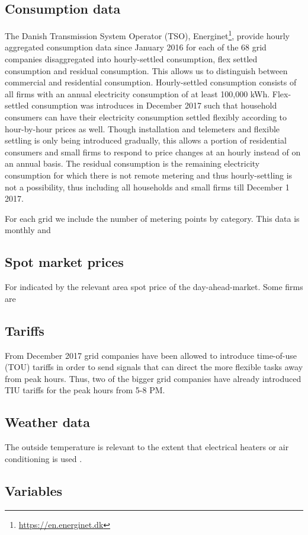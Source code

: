 \label{sec:data}
\subsection{Consumption data}
\label{subsec:data_consumption}
The Danish Transmission System Operator (TSO), Energinet\footnote{\url{https://en.energinet.dk}}, provide hourly aggregated consumption data since January 2016 for each of the 68 grid companies disaggregated into hourly-settled consumption, flex settled consumption and residual consumption. This allows us to distinguish between commercial and residential consumption. Hourly-settled consumption consists of all firms with an annual electricity consumption of at least 100,000 kWh. Flex-settled consumption was introduces in December 2017 such that household consumers can have their electricity consumption settled flexibly according to hour-by-hour prices as well. Though installation and telemeters and flexible settling is only being introduced gradually, this allows a portion of residential consumers and small firms to respond to price changes at an hourly instead of on an annual basis. The residual consumption is the remaining electricity consumption for which there is not remote metering and thus hourly-settling is not a possibility, thus including all households and small firms till December 1 2017.
\par
For each grid we include the number of metering points by category. This data is monthly and 



\subsection{Spot market prices}
\label{subsec:data_spot}
For  indicated by the relevant area spot price of the day-ahead-market. Some firms are 


\subsection{Tariffs}
From December 2017 grid companies have been allowed to introduce time-of-use (TOU) tariffs in order to send signals that can direct the more flexible tasks away from peak hours. Thus, two of the bigger grid companies have already introduced TIU tariffs for the peak hours from 5-8 PM.


\subsection{Weather data}


The outside temperature is relevant to the extent that electrical heaters or air conditioning is used \citep{lijesen2007real, vesterberg2014residential}.


\subsection{Variables}
\label{subsec:variables}

